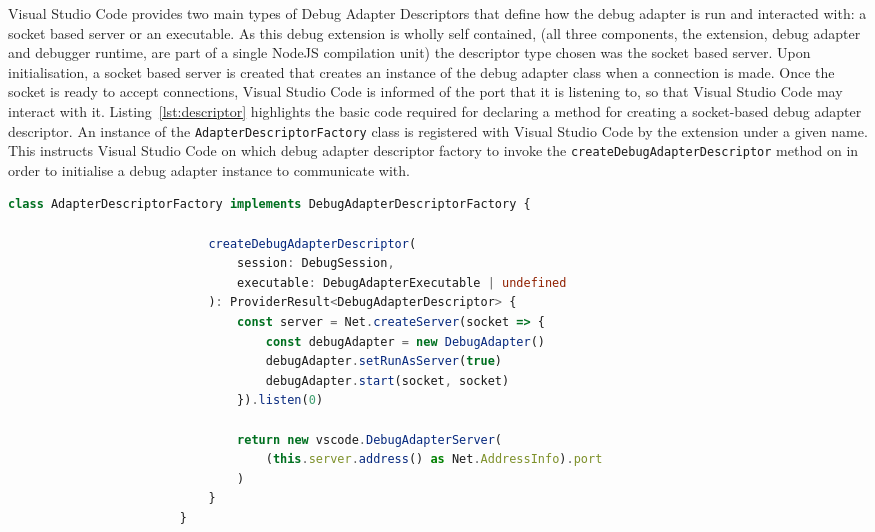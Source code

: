 \documentclass[12pt,pdftex,titlepage]{report}
\begin{document}
                \newpage
                Visual Studio Code provides two main types of Debug Adapter Descriptors that define how the debug adapter is run and interacted with: a socket based server or an executable. As this debug extension is wholly self contained, 
                (all three components, the extension, debug adapter and debugger runtime, are part of a single NodeJS compilation unit) the descriptor type chosen was the socket based server. Upon initialisation, a socket based server is 
                created that creates an instance of the debug adapter class when a connection is made. Once the socket is ready to accept connections, Visual Studio Code is informed of the port that it is listening to, so that Visual Studio 
                Code may interact with it. Listing~\ref{lst:descriptor} highlights the basic code required for declaring a method for creating a socket-based debug adapter descriptor. An instance of the \texttt{AdapterDescriptorFactory} class 
                is registered with Visual Studio Code by the extension under a given name. This instructs Visual Studio Code on which debug adapter descriptor factory to invoke the \texttt{createDebugAdapterDescriptor} method on in order to 
                initialise a debug adapter instance to communicate with.

                \newpage
                \begin{spacing}{1.0}
                    \begin{lstlisting}[label={lst:descriptor}, gobble=24, language=TypeScript, caption={The method used to initialise the Debug Adapter and return the Debug Adapter Descriptor to Visual Studio Code.}]
                        class AdapterDescriptorFactory implements DebugAdapterDescriptorFactory {
                            
                            createDebugAdapterDescriptor(
                                session: DebugSession,
                                executable: DebugAdapterExecutable | undefined
                            ): ProviderResult<DebugAdapterDescriptor> {
                                const server = Net.createServer(socket => {
                                    const debugAdapter = new DebugAdapter()
                                    debugAdapter.setRunAsServer(true)
                                    debugAdapter.start(socket, socket)
                                }).listen(0)

                                return new vscode.DebugAdapterServer(
                                    (this.server.address() as Net.AddressInfo).port
                                )
                            }
                        }
                    \end{lstlisting}
                \end{spacing}
\end{document}
